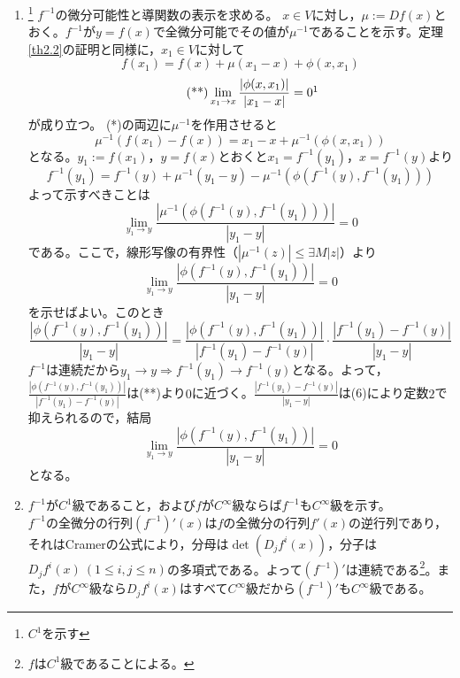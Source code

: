 \documentclass[dvipdfmx,a4j,10pt]{jsarticle}
\makeatletter
\theoremstyle{mystyle1}
\theoremstyle{mystyle2}
\renewenvironment{proof}[1][\proofname]{\par
  \pushQED{\qed}%
  \normalfont
  \topsep6\p@\@plus6\p@ \trivlist
  \item[\hskip\labelsep{\bfseries\sffamily #1}]\ignorespaces
}{%
  \popQED\endtrivlist\@endpefalse
}
\renewcommand\proofname{証明}
\makeatother
\begin{document}
\begin{proof}
\begin{enumerate}
	\item\footnote{$C^1$を示す}
	$f^{-1}$の微分可能性と導関数の表示を求める。
	$x\in V$に対し，$\mu:=Df(x)$とおく。$f^{-1}$が$y=f(x)$で全微分可能でその値が$\mu^{-1}$であることを示す。定理\ref{th2.2}の証明と同様に，$x_1\in V$に対して
	\begin{equation}\tag{*}
		f(x_1)=f(x)+\mu(x_1-x)+\phi(x,x_1)
	\end{equation}
	\begin{equation}\tag{**}
	\lim_{x_1\to x}\frac{|\phi(x,x_1)|}{|x_1-x|}=0\footnotemark
	\end{equation}
	が成り立つ。
	(*)の両辺に$\mu^{-1}$を作用させると
	\[
	\mu^{-1}(f(x_1)-f(x))=x_1-x+\mu^{-1}(\phi(x,x_1))
	\]
	となる。$y_1:=f(x_1)$，$y=f(x)$とおくと$x_1=f^{-1}(y_1)$，$x=f^{-1}(y)$より
	\begin{equation}\tag{*'}
		f^{-1}(y_1)=f^{-1}(y)+\mu^{-1}(y_1-y)-\mu^{-1}(\phi(f^{-1}(y),f^{-1}(y_1)))
	\end{equation}
	よって示すべきことは
	\[
	\lim_{y_1\to y}\frac{|\mu^{-1}(\phi(f^{-1}(y),f^{-1}(y_1)))|}{|y_1-y|}=0
	\]
	である。ここで，線形写像の有界性（$|\mu^{-1}(z)|\leq\exists M|z|$）より
	\[
	\lim_{y_1\to y}\frac{|\phi(f^{-1}(y),f^{-1}(y_1))|}{|y_1-y|}=0
	\]
	を示せばよい。このとき
	\[
		\frac{|\phi(f^{-1}(y),f^{-1}(y_1))|}{|y_1-y|}=\frac{|\phi(f^{-1}(y),f^{-1}(y_1))|}{|f^{-1}(y_1)-f^{-1}(y)|}\cdot\frac{|f^{-1}(y_1)-f^{-1}(y)|}{|y_1-y|}
	\]
	$f^{-1}$は連続だから$y_1\to y \Rightarrow f^{-1}(y_1)\to f^{-1}(y)$となる。よって，$\displaystyle \frac{|\phi(f^{-1}(y),f^{-1}(y_1))|}{|f^{-1}(y_1)-f^{-1}(y)|}$は(**)より$0$に近づく。$\displaystyle \frac{|f^{-1}(y_1)-f^{-1}(y)|}{|y_1-y|}$は(6)により定数$2$で抑えられるので，結局
	\[
	\lim_{y_1\to y}\frac{|\phi(f^{-1}(y),f^{-1}(y_1))|}{|y_1-y|}=0
	\]
	となる。

	\item $f^{-1}$が$C^1$級であること，および$f$が$C^\infty$級ならば$f^{-1}$も$C^\infty$級を示す。\\
	$f^{-1}$の全微分の行列$(f^{-1})'(x)$は$f$の全微分の行列$f'(x)$の逆行列であり，それはCramerの公式により，分母は$\det(D_jf^i(x))$，分子は$D_jf^i(x)\ (1\leq i,j\leq n)$の多項式である。よって$(f^{-1})'$は連続である\footnote{$f$は$C^1$級であることによる。}。また，$f$が$C^\infty$級なら$D_jf^i(x)$はすべて$C^\infty$級だから$(f^{-1})'$も$C^\infty$級である。
	\end{enumerate}
\end{proof}
\end{document}
